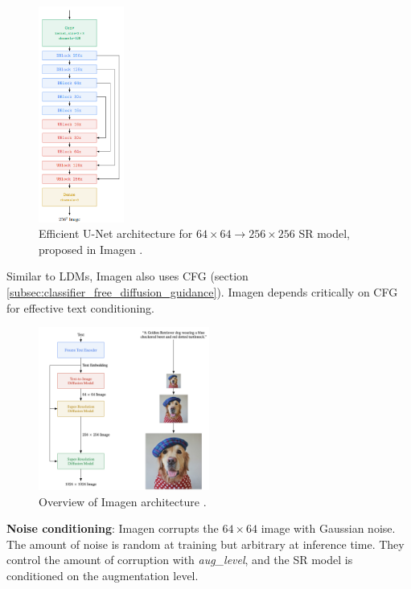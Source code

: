\begin{figure}
    \centering
    \includegraphics[width=0.25\textwidth]{images/imagen/efficient_unet.png}
    \caption{Efficient U-Net architecture for $64\times 64 \rightarrow 256\times 256$ SR model, proposed in Imagen \cite{imagen}.}
    \label{fig:imagen_efficient_unet}
\end{figure}

Similar to LDMs, Imagen also uses CFG \cite{classifier_free_guidance} (section \ref{subsec:classifier_free_diffusion_guidance}). Imagen depends critically on CFG for effective text conditioning.

\begin{figure}
    \centering
    \includegraphics[width=0.5\textwidth]{images/imagen/architecture.png}
    \caption{Overview of Imagen architecture \cite{imagen}.}
    \label{fig:imagen_architecture}
\end{figure}

\textbf{Noise conditioning}: Imagen corrupts the $64\times 64$ image with Gaussian noise. The amount of noise is random at training but arbitrary at inference time. They control the amount of corruption with \textit{aug\_level}, and the SR model is conditioned on the augmentation level.

